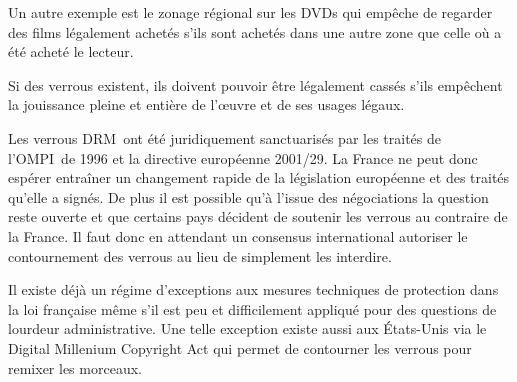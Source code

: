 Un autre exemple est le zonage régional sur les DVDs qui empêche de regarder des films légalement achetés s'ils sont achetés dans une autre zone que celle où a été acheté le lecteur.

\begin{mesure}
Si des verrous existent, ils doivent pouvoir être légalement cassés s'ils empêchent la jouissance pleine et entière de l'œuvre et de ses usages légaux. 
\end{mesure}

Les verrous DRM ont été juridiquement sanctuarisés par les traités de l'OMPI de 1996 et la directive européenne 2001/29. La France ne peut donc espérer entraîner un changement rapide de la législation européenne et des traités qu'elle a signés. De plus il est possible qu'à l'issue des négociations la question reste ouverte et que certains pays décident de soutenir les verrous au contraire de la France. Il faut donc en attendant un consensus international autoriser le contournement des verrous au lieu de simplement les interdire. 

Il existe déjà un régime d'exceptions aux mesures techniques de protection dans la loi française même s'il est peu et difficilement appliqué pour des questions de lourdeur administrative. Une telle exception existe aussi aux États-Unis via le Digital Millenium Copyright Act qui permet de contourner les verrous pour remixer les morceaux. 

